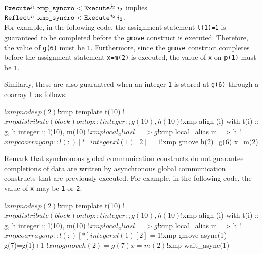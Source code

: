 \noindent
$\texttt{Execute}^{j_1} \: {\texttt{xmp\_syncro}} < \texttt{Execute}^{j_2} \: {i_2}$ implies $\texttt{Reflect}^{j_1} \: {\texttt{xmp\_syncro}} < \texttt{Execute}^{j_2} \: {i_2}$.\\

For example, in the following code, the assignment statement \texttt{l(1)=1} is
guaranteed to be completed before the \texttt{gmove} construct is
executed.  Therefore, the value of \texttt{g(6)} must be \texttt{1}.
Furthermore, since the \texttt{gmove} construct completes before the
assignment statement \texttt{x=m(2)} is executed, the value of \texttt{x} on
\texttt{p(1)} must be \texttt{1}.
\begin{center}
\end{center}

Similarly, these are also guaranteed when an integer \texttt{1} is
stored at \texttt{g(6)} through a coarray \texttt{l} as follows:
\begin{center}
\begin{XFexample}
!$xmp nodes p(2)
!$xmp template t(10)
!$xmp distribute (block) onto p :: t
      integer :; g(10), h(10)
!$xmp align (i) with t(i) :: g, h
      integer :; l(10), m(10)
!$xmp local_alias l => g
!$xmp local_alias m => h
!$xmp coarray on p :: l(:)[*]
      integer x

      l(1)[2]=1
!$xmp gmove
      h(2)=g(6)
      x=m(2)
\end{XFexample}
\end{center}

Remark that synchronous global communication constructs do not
guarantee completions of data are written by asynchronous global
communication constructs that are previously executed.  For example,
in the following code, the value of \texttt{x} may be \texttt{1} or
\texttt{2}.

\begin{center}
\begin{XFexample}
!$xmp nodes p(2)
!$xmp template t(10)
!$xmp distribute (block) onto p :: t
      integer :; g(10), h(10)
!$xmp align (i) with t(i) :: g, h
      integer :; l(10), m(10)
!$xmp local_alias l => g
!$xmp local_alias m => h
!$xmp coarray on p :: l(:)[*]
      integer x

      l(1)[2]=1
!$xmp gmove async(1)
      g(7)=g(1)+1
!$xmp gmove
      h(2)=g(7)
      x=m(2)
!$xmp wait_async(1)
\end{XFexample}
\end{center}

